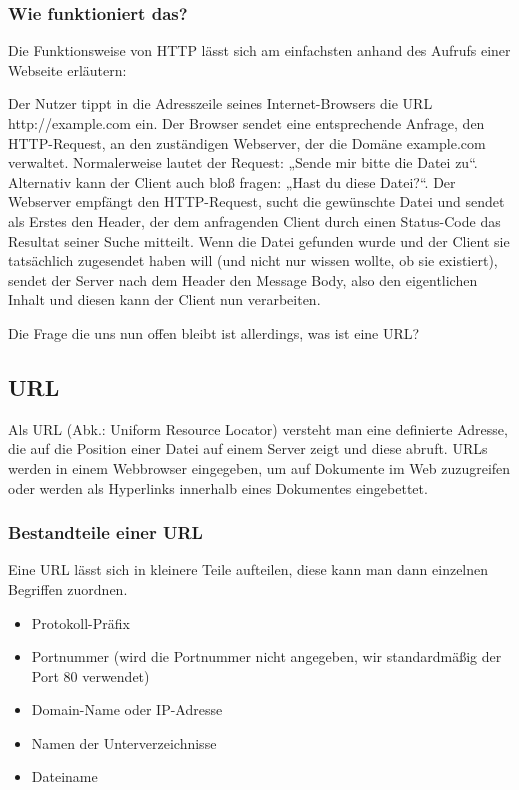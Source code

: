 \documentclass{article}
\begin{document}
\subsubsection{Wie funktioniert das?}
Die Funktionsweise von HTTP lässt sich am einfachsten anhand des Aufrufs einer Webseite erläutern: \vspace{1em}

\noindent 
Der Nutzer tippt in die Adresszeile seines Internet-Browsers die URL http://example.com ein.
Der Browser sendet eine entsprechende Anfrage, den HTTP-Request, an den zuständigen Webserver, der die Domäne example.com verwaltet. \newline \noindent Normalerweise lautet der Request: „Sende mir bitte die Datei zu“. Alternativ kann der Client auch bloß fragen: „Hast du diese Datei?“. \newline \noindent
Der Webserver empfängt den HTTP-Request, sucht die gewünschte Datei und sendet als Erstes den Header, der dem anfragenden Client durch einen Status-Code das Resultat seiner Suche mitteilt. \newline \noindent Wenn die Datei gefunden wurde und der Client sie tatsächlich zugesendet haben will (und nicht nur wissen wollte, ob sie existiert), sendet der Server nach dem Header den Message Body, also den eigentlichen Inhalt und diesen kann der Client nun verarbeiten. \vspace{1em}
 
\noindent Die Frage die uns nun offen bleibt ist allerdings, was ist eine URL?

\subsection{URL}
Als URL (Abk.: Uniform Resource Locator) versteht man eine definierte Adresse, die auf die Position einer Datei auf einem Server zeigt und diese abruft. URLs werden in einem Webbrowser eingegeben, um auf Dokumente im Web zuzugreifen oder werden als Hyperlinks innerhalb eines Dokumentes eingebettet.

\subsubsection{Bestandteile einer URL}
Eine URL lässt sich in kleinere Teile aufteilen, diese kann man dann einzelnen Begriffen zuordnen.
\begin{itemize}
\item Protokoll-Präfix
\item Portnummer (wird die Portnummer nicht angegeben, wir standardmäßig der Port 80 verwendet)
\item Domain-Name oder IP-Adresse
\item Namen der Unterverzeichnisse
\item Dateiname
\end{itemize}
\end{document}
